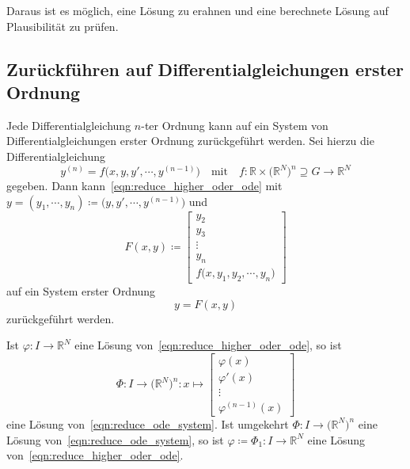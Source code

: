 \documentclass[a4paper, 11pt, accentcolor = tud3b]{tudreport}
\newcommand{\R}{\mathbb{R}}
\begin{document}
				Daraus ist es möglich, eine Lösung zu erahnen und eine berechnete Lösung auf Plausibilität zu prüfen.

			\subsection{Zurückführen auf Differentialgleichungen erster Ordnung}
				Jede Differentialgleichung \(n\)-ter Ordnung kann auf ein System von Differentialgleichungen erster Ordnung zurückgeführt werden. Sei hierzu die Differentialgleichung
				\begin{equation}
					y^{(n)} = f\big(x, y, y', \cdots, y^{(n  - 1)}\big) \quad\text{mit}\quad f : \R \times \big(\R^N\big)^n \supseteq G \to \R^N  \label{eqn:reduce_higher_oder_ode}
				\end{equation}
				gegeben. Dann kann~\ref{eqn:reduce_higher_oder_ode} mit \( y = (y_1, \cdots, y_n) \coloneqq \big(y, y', \cdots, y^{(n - 1)}\big) \) und
				\begin{equation*}
					F(x, y) \coloneqq
						\begin{bmatrix}
							y_2 \\
							y_3 \\
							\vdots \\
							y_n \\
							f\big(x, y_1, y_2, \cdots, y_n\big)
						\end{bmatrix}
				\end{equation*}
				auf ein System erster Ordnung
				\begin{equation}
					y = F(x, y)  \label{eqn:reduce_ode_system}
				\end{equation}
				zurückgeführt werden.
				
				Ist \( \varphi : I \to \R^N \) eine Lösung von~\ref{eqn:reduce_higher_oder_ode}, so ist
				\begin{equation*}
					\Phi : I \to \big(\R^N\big)^n : x \mapsto
						\begin{bmatrix}
							\varphi(x) \\
							\varphi'(x) \\
							\vdots \\
							\varphi^{(n - 1)}(x)
						\end{bmatrix}
				\end{equation*}
				eine Lösung von~\ref{eqn:reduce_ode_system}. Ist umgekehrt \( \Phi : I \to \big(\R^N\big)^n \) eine Lösung von~\ref{eqn:reduce_ode_system}, so ist \( \varphi \coloneqq \Phi_1 : I \to \R^N \) eine Lösung von~\ref{eqn:reduce_higher_oder_ode}.
\end{document}
